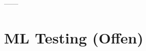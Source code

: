 \begin{comment}
	https://beenje.github.io/blog/posts/gitlab-ci-and-conda/
	https://stackoverflow.com/questions/57754356/activating-conda-environment-during-gitlab-ci
\end{comment}
------
\section{ML Testing (Offen)}
\begin{comment} 
	Webseiten die darauf referenieren
	https://deepchecks.com/how-to-test-machine-learning-models/
	https://deepchecks.com/machine-learning-testing-principles-making-sure-your-model-does-what-you-think-it-should-do/
	https://deepchecks.com
\end{comment}